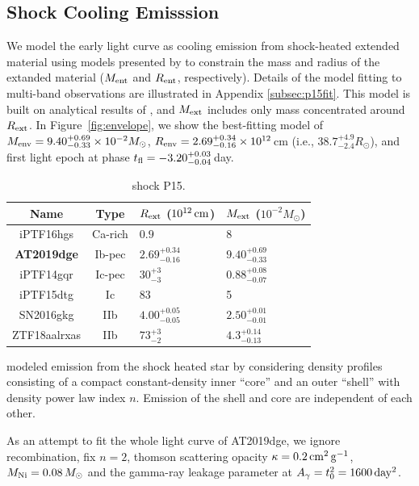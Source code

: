 \documentclass[twocolumn]{aastex63}
\begin{document}
\begin{CJK*}{UTF8}{gbsn}
\subsection{Shock Cooling Emisssion} \label{subsec:shock}
We model the early light curve as cooling emission from shock-heated extended material using models 
presented by \citet[][hereafter P15]{Piro2015} to constrain the mass and radius of the extanded material
($M_{\rm ent}$ and $R_{\rm ent}$, respectively). Details of the model fitting to multi-band observations 
are illustrated in Appendix \ref{subsec:p15fit}. This model is built on analytical results of 
\citet{Nakar2014}, and $M_{\rm ext}$ includes only mass concentrated around $R_{\rm ext}$. In 
Figure~\ref{fig:envelope}, we show the best-fitting model of $M_{\rm env} = 9.40_{-0.33}^{+0.69}\times 
10^{-2} M_\odot$, $R_{\rm env} =2.69_{-0.16}^{+0.34}\times10^{12}$\,cm (i.e., $38.7_{-2.4}^{+4.9} 
R_\odot$), and first light epoch at phase $t_{\rm fl}= -3.20_{-0.04}^{+0.03}$\,day.

\begin{table}[!htbp] 
	\centering 
	\caption{shock P15.} 
	\begin{tabular}{ccll} 
		\hline 
		Name  &Type & $R_{\rm ext}$ ($10^{12}\,{\rm cm}$) & $M_{\rm ext}$ ($10^{-2} M_\odot$)  \\ 
		\hline
		iPTF16hgs & Ca-rich & $0.9$ & 8\\
		\textbf{AT2019dge} & Ib-pec & $2.69_{-0.16}^{+0.34}$ & $9.40_{-0.33}^{+0.69}$  \\
		iPTF14gqr & Ic-pec &$30^{+3}_{-3}$ &$0.88^{+0.08}_{-0.07}$  \\
		iPTF15dtg & Ic & 83&5 \\
		SN2016gkg & IIb &$4.00^{+0.05}_{-0.05}$ &$2.50^{+0.01}_{-0.01}$  \\
		ZTF18aalrxas & IIb & $73^{+3}_{-2}$  & $4.3_{-0.13}^{+0.14}$ \\
		\hline 
	\end{tabular} 
	\label{tab:bbfit} 
\end{table} 


\citet[][hereafter N16]{Nagy2016} modeled emission from the shock heated star by considering 
density profiles consisting of a compact constant-density inner ``core'' and an outer ``shell'' with 
density power law index $n$. Emission of the shell and core are independent of each other. 

As an attempt to fit the whole light curve of AT2019dge, we ignore 
recombination, fix $n=2$, thomson scattering opacity $\kappa=0.2\,{\rm cm^2\,g^{-1}}$, $M_{\rm 
Ni}=0.08\,M_\odot$ and the gamma-ray leakage parameter at $A_\gamma = t_0^2 = 1600\,{\rm day^2}$.


\end{CJK*}
\end{document}
